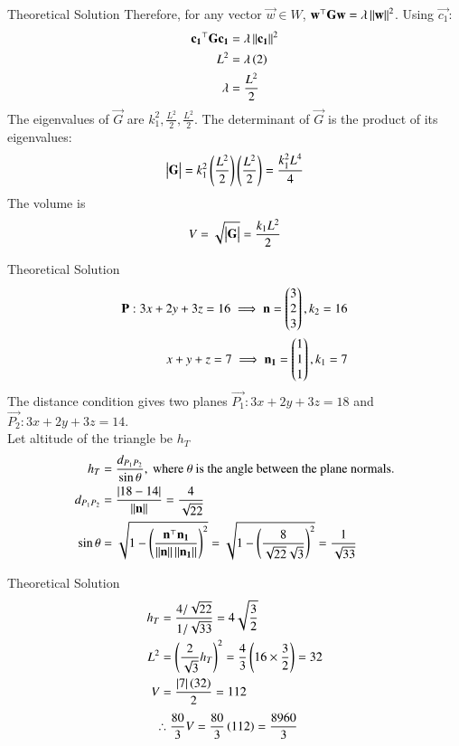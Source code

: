 \documentclass{beamer}
\begin{document}
\begin{frame}{Theoretical Solution}
    Therefore, for any vector $\vec{w} \in W$, $\mathbf{w}^\top\mathbf{G}\mathbf{w} = \lambda\left\lVert\mathbf{w}\right\rVert^2$.
Using $\vec{c_1}$:
\begin{align}
    \mathbf{c_1}^\top\mathbf{G}\mathbf{c_1} &= \lambda\left\lVert\mathbf{c_1}\right\rVert^2 \\
    L^2 &= \lambda\left(2\right) \\
    \lambda &= \frac{L^2}{2}
\end{align}
The eigenvalues of $\vec{G}$ are $k_1^2, \frac{L^2}{2}, \frac{L^2}{2}$. The determinant of $\vec{G}$ is the product of its eigenvalues:
\begin{align}
    \begin{vmatrix}\mathbf{G}\end{vmatrix} = k_1^2 \left(\frac{L^2}{2}\right) \left(\frac{L^2}{2}\right) = \frac{k_1^2 L^4}{4}
\end{align}
The volume is 
\begin{align}
    V = \sqrt{\begin{vmatrix}\mathbf{G}\end{vmatrix}} = \frac{k_1 L^2}{2}
\end{align}
\end{frame}

\begin{frame}{Theoretical Solution}
\begin{align}
    \mathbf{P}: 3x+2y+3z=16 \implies \mathbf{n} = \begin{pmatrix}3 \\ 2 \\ 3\end{pmatrix}, k_2=16 \\
    x+y+z=7 \implies \mathbf{n_1} = \begin{pmatrix}1 \\ 1 \\ 1\end{pmatrix}, k_1=7 \\
\end{align}
The distance condition gives two planes $\vec{P_1}: 3x+2y+3z=18$ and $\vec{P_2}: 3x+2y+3z=14$. \\
Let altitude of the triangle be $h_T$
\begin{align}
    h_T &= \frac{d_{P_1P_2}}{\sin\theta},\text{ where }\theta\text{ is the angle between the plane normals.} \\
    d_{P_1P_2} &= \frac{\left\vert18-14\right\vert}{\left\lVert\mathbf{n}\right\rVert} = \frac{4}{\sqrt{22}} \\
    \sin\theta &= \sqrt{1 - \left(\frac{\mathbf{n}^\top\mathbf{n_1}}{\left\lVert\mathbf{n}\right\rVert\left\lVert\mathbf{n_1}\right\rVert}\right)^2} = \sqrt{1 - \left(\frac{8}{\sqrt{22}\sqrt{3}}\right)^2} = \frac{1}{\sqrt{33}}
\end{align}
\end{frame}

\begin{frame}{Theoretical Solution}
\begin{align}
    h_T &= \frac{4/\sqrt{22}}{1/\sqrt{33}} = 4\sqrt{\frac{3}{2}} \\
    L^2 &= \left(\frac{2}{\sqrt{3}}h_T\right)^2 = \frac{4}{3}\left(16 \times \frac{3}{2}\right) = 32 \\
    V &= \frac{\left\vert7\right\vert\left(32\right)}{2} = 112
\end{align}
\begin{align}
    \therefore \frac{80}{3}V &= \frac{80}{3}\left(112\right) = \frac{8960}{3}
\end{align}
\end{frame}
\end{document}
